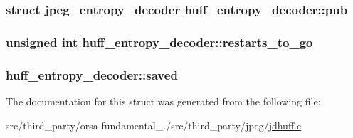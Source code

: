 \subsubsection[{pub}]{\setlength{\rightskip}{0pt plus 5cm}struct {\bf jpeg\+\_\+entropy\+\_\+decoder} huff\+\_\+entropy\+\_\+decoder\+::pub}\label{structhuff__entropy__decoder_a85f304c89441e96be66e49685cf24c3d}
\hypertarget{structhuff__entropy__decoder_af6005b639dada949c62767bed24daa1a}{}
\subsubsection[{restarts\+\_\+to\+\_\+go}]{\setlength{\rightskip}{0pt plus 5cm}unsigned int huff\+\_\+entropy\+\_\+decoder\+::restarts\+\_\+to\+\_\+go}\label{structhuff__entropy__decoder_af6005b639dada949c62767bed24daa1a}
\hypertarget{structhuff__entropy__decoder_a0e0efb55a8a5b01e1e49aa9c3fb8dfe6}{}
\subsubsection[{saved}]{ huff\+\_\+entropy\+\_\+decoder\+::saved}\label{structhuff__entropy__decoder_a0e0efb55a8a5b01e1e49aa9c3fb8dfe6}


The documentation for this struct was generated from the following file\+:\begin{DoxyCompactItemize}
\item 
src/third\+\_\+party/orsa-\/fundamental\+\_./src/third\+\_\+party/jpeg/\hyperlink{jdhuff_8c}{jdhuff.\+c}\end{DoxyCompactItemize}
